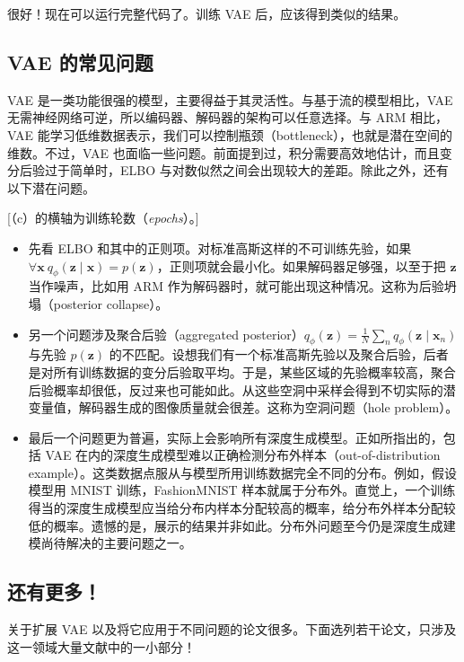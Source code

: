 很好！现在可以运行完整代码了。训练 VAE 后，应该得到类似的结果。

\subsection{VAE 的常见问题}
VAE 是一类功能很强的模型，主要得益于其灵活性。与基于流的模型相比，VAE 无需神经网络可逆，所以编码器、解码器的架构可以任意选择。与 ARM 相比，VAE 能学习低维数据表示，我们可以控制瓶颈（bottleneck），也就是潜在空间的维数。不过，VAE 也面临一些问题。前面提到过，积分需要高效地估计，而且变分后验过于简单时，ELBO 与对数似然之间会出现较大的差距。除此之外，还有以下潜在问题。

[（c）的横轴为训练轮数（\textit{epochs}）。]

\begin{itemize}
\item 先看 ELBO 和其中的正则项。对标准高斯这样的不可训练先验，如果 $\forall\mathbf{x}\ q_\phi(\mathbf{z}\mid\mathbf{x})=p(\mathbf{z})$，正则项就会最小化。如果解码器足够强，以至于把 $\mathbf{z}$ 当作噪声，比如用 ARM 作为解码器时，就可能出现这种情况。这称为后验坍塌（posterior collapse）。
\item 另一个问题涉及聚合后验（aggregated posterior）$q_\phi(\mathbf{z})=\frac{1}{N}\sum_n q_\phi(\mathbf{z}\mid\mathbf{x}_n)$ 与先验 $p(\mathbf{z})$ 的不匹配。设想我们有一个标准高斯先验以及聚合后验，后者是对所有训练数据的变分后验取平均。于是，某些区域的先验概率较高，聚合后验概率却很低，反过来也可能如此。从这些空洞中采样会得到不切实际的潜变量值，解码器生成的图像质量就会很差。这称为空洞问题（hole problem）。
\item 最后一个问题更为普遍，实际上会影响所有深度生成模型。正如所指出的，包括 VAE 在内的深度生成模型难以正确检测分布外样本（out-of-distribution example）。这类数据点服从与模型所用训练数据完全不同的分布。例如，假设模型用 MNIST 训练，FashionMNIST 样本就属于分布外。直觉上，一个训练得当的深度生成模型应当给分布内样本分配较高的概率，给分布外样本分配较低的概率。遗憾的是，展示的结果并非如此。分布外问题至今仍是深度生成建模尚待解决的主要问题之一。
\end{itemize}

\subsection{还有更多！}
关于扩展 VAE 以及将它应用于不同问题的论文很多。下面选列若干论文，只涉及这一领域大量文献中的一小部分！

